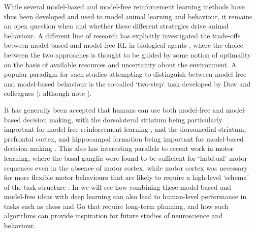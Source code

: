 While several model-based and model-free reinforcement learning methods have thus been developed and used to model animal learning and behaviour, it remains an open question when and whether these different strategies drive animal behaviour.
A different line of research has explicitly investigated the trade-offs between model-based and model-free RL in biological agents \citep{daw2005uncertainty, geerts2020general, lengyel2007hippocampal}, where the choice between the two approaches is thought to be guided by some notion of optimality on the basis of available resources and uncertainty about the environment.
A popular paradigm for such studies attempting to distinguish between model-free and model-based behaviour is the so-called `two-step' task developed by Daw and colleagues (\citealp{daw2011model,momennejad2017successor,wang2018prefrontal}; although note \citealp{akam2015simple}).

It has generally been accepted that humans can use both model-free and model-based decision making, with the dorsolateral striatum being particularly important for model-free reinforcement learning \citep{yin2004lesions, yin2005role}, and the dorsomedial striatum, prefrontal cortex, and hippocampal formation being important for model-based decision making \citep{vikbladh2019hippocampal,geerts2020general,miller2017dorsal,niv2009reinforcement,killcross2003coordination}.
This also has interesting parallels to recent work in motor learning, where the basal ganglia were found to be sufficient for `habitual' motor sequences even in the absence of motor cortex, while motor cortex was necessary for more flexible motor behaviours that are likely to require a high-level `schema' of the task structure \citep{mizes2023motor,mizes2023dissociating}.
In  we will see how combining these model-based and model-free ideas with deep learning can also lead to human-level performance in tasks such as chess and Go that require long-term planning, and how such algorithms can provide inspiration for future studies of neuroscience and behaviour.
